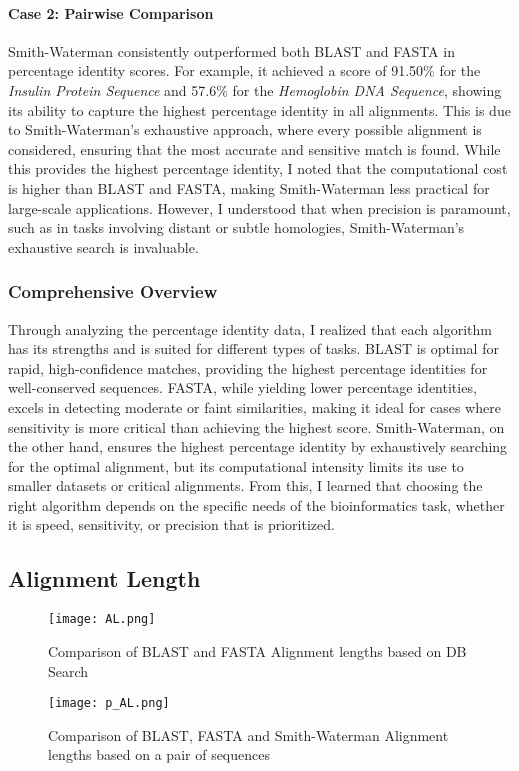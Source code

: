 \documentclass{article}
\begin{document}
\paragraph{Case 2: Pairwise Comparison}
Smith-Waterman consistently outperformed both BLAST and FASTA in percentage identity scores. For example, it achieved a score of 91.50\% for the \textit{Insulin Protein Sequence} and 57.6\% for the \textit{Hemoglobin DNA Sequence}, showing its ability to capture the highest percentage identity in all alignments. This is due to Smith-Waterman’s exhaustive approach, where every possible alignment is considered, ensuring that the most accurate and sensitive match is found. While this provides the highest percentage identity, I noted that the computational cost is higher than BLAST and FASTA, making Smith-Waterman less practical for large-scale applications. However, I understood that when precision is paramount, such as in tasks involving distant or subtle homologies, Smith-Waterman’s exhaustive search is invaluable.

\subsubsection{Comprehensive Overview}
Through analyzing the percentage identity data, I realized that each algorithm has its strengths and is suited for different types of tasks. BLAST is optimal for rapid, high-confidence matches, providing the highest percentage identities for well-conserved sequences. FASTA, while yielding lower percentage identities, excels in detecting moderate or faint similarities, making it ideal for cases where sensitivity is more critical than achieving the highest score. Smith-Waterman, on the other hand, ensures the highest percentage identity by exhaustively searching for the optimal alignment, but its computational intensity limits its use to smaller datasets or critical alignments. From this, I learned that choosing the right algorithm depends on the specific needs of the bioinformatics task, whether it is speed, sensitivity, or precision that is prioritized.

\subsection{Alignment Length}
\begin{figure}[H]
  \centering
  \texttt{[image: AL.png]}
  \caption{Comparison of BLAST and FASTA Alignment lengths based on DB Search}
  \label{fig:yourlabel}
\end{figure}
\begin{figure}[H]
  \centering
  \texttt{[image: p\_AL.png]}
  \caption{Comparison of BLAST, FASTA and Smith-Waterman Alignment lengths based on a pair of sequences}
  \label{fig:yourlabel}
\end{figure}
\end{document}
